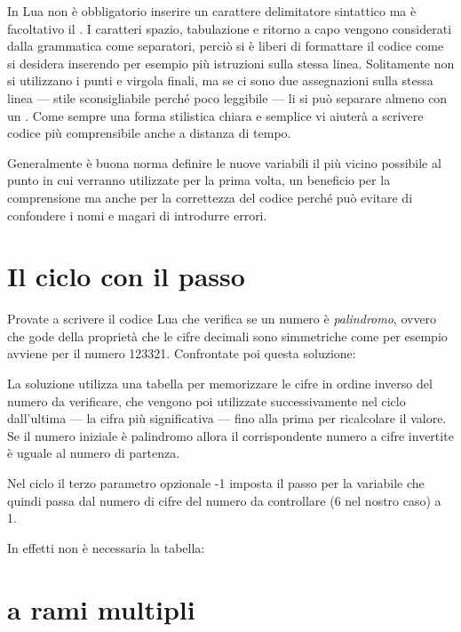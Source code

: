 In Lua non è obbligatorio inserire un carattere delimitatore sintattico ma è
facoltativo il \key{;}. I caratteri spazio, tabulazione e ritorno a capo vengono
considerati dalla grammatica come separatori, perciò si è liberi di formattare
il codice come si desidera inserendo per esempio più istruzioni sulla stessa
linea. Solitamente non si utilizzano i punti e virgola finali, ma se ci sono due
assegnazioni sulla stessa linea --- stile sconsigliabile perché poco leggibile
--- li si può separare almeno con un \key{;}. Come sempre una forma stilistica
chiara e semplice vi aiuterà a scrivere codice più comprensibile anche a
distanza di tempo.

Generalmente è buona norma definire le nuove variabili il più vicino possibile
al punto in cui verranno utilizzate per la prima volta, un beneficio per la
comprensione ma anche per la correttezza del codice perché può evitare di
confondere i nomi e magari di introdurre errori.


\section{Il ciclo  con il passo}

Provate a scrivere il codice Lua che verifica se un numero è \emph{palindromo},
ovvero che gode della proprietà che le cifre decimali sono simmetriche come per
esempio avviene per il numero 123321. Confrontate poi questa soluzione:

La soluzione utilizza una tabella per memorizzare le cifre in ordine inverso
del numero da verificare, che vengono poi utilizzate successivamente nel ciclo
 dall'ultima --- la cifra più significativa --- fino alla prima per
ricalcolare il valore. Se il numero iniziale è palindromo allora il
corrispondente numero a cifre invertite è uguale al numero di partenza.

Nel ciclo  il terzo parametro opzionale -1 imposta il passo per la
variabile  che quindi passa dal numero di cifre del numero da
controllare (6 nel nostro caso) a 1.

In effetti non è necessaria la tabella:


\section{ a rami multipli}

